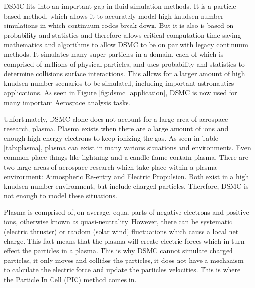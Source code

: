 \indent DSMC fits into an important gap in fluid simulation methods. It is a particle based method, which allows it to accurately model high knudsen number simulations in which continuum codes break down. But it is also is based on probability and statistics and therefore allows critical computation time saving mathematics and algorithms to allow DSMC to be on par with legacy continuum methods. It simulates many super-particles in a domain, each of which is comprised of millions of physical particles, and uses probability and statistics to determine collisions surface interactions. This allows for a larger amount of high knudsen number scenarios to be simulated, including important astronautics applications. As seen in Figure \ref{fig:dsmc_application}, DSMC is now used for many important Aerospace analysis tasks. \par


\indent Unfortunately, DSMC alone does not account for a large area of aerospace research, plasma. Plasma exists when there are a large amount of ions and enough high energy electrons to keep ionizing the gas. As seen in Table \ref{tab:plasma}, plasma can exist in many various situations and environments. Even common place things like lightning and a candle flame contain plasma. There are two large areas of aerospace research which take place within a plasma environment: Atmospheric Re-entry and Electric Propulsion. Both exist in a high knudsen number environment, but include charged particles. Therefore, DSMC is not enough to model these situations. \par




\indent Plasma is comprised of, on average, equal parts of negative electrons and positive ions, otherwise known as quasi-neutrality. However, there can be systematic (electric thruster) or random (solar wind) fluctuations which cause a local net charge. This fact means that the plasma will create electric forces which in turn effect the particles in a plasma. This is why DSMC cannot simulate charged particles, it only moves and collides the particles, it does not have a mechanism to calculate the electric force and update the particles velocities. This is where the Particle In Cell (PIC) method comes in. \par


